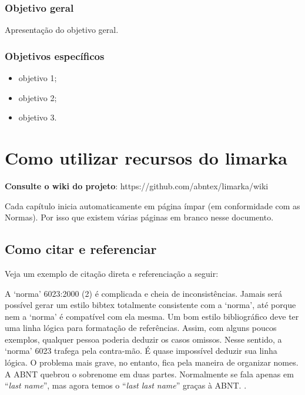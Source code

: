 \documentclass[
	12pt,				%
	oneside,			%
	a4paper,			%
	english,			%
	french,				%
	spanish,			%
	brazil				%
	]{abntex2}
\renewenvironment{quote}
  {\small\list{}{\rightmargin=0.1cm \leftmargin=4cm}%
   \item\relax}
  {\endlist}
\begin{document}
\hypertarget{objetivo-geral}{%
\subsection{Objetivo geral}\label{objetivo-geral}}

Apresentação do objetivo geral.

\hypertarget{objetivos-especuxedficos}{%
\subsection{Objetivos específicos}\label{objetivos-especuxedficos}}

\begin{itemize}
\tightlist
\item
  objetivo 1;
\item
  objetivo 2;
\item
  objetivo 3.
\end{itemize}

\hypertarget{como-utilizar-recursos-do-limarka}{%
\chapter{Como utilizar recursos do
limarka}\label{como-utilizar-recursos-do-limarka}}

\textbf{Consulte o wiki do projeto}:
https://github.com/abntex/limarka/wiki

Cada capítulo inicia automaticamente em página ímpar (em conformidade
com as Normas). Por isso que existem várias páginas em branco nesse
documento.

\hypertarget{como-citar-e-referenciar}{%
\section{Como citar e referenciar}\label{como-citar-e-referenciar}}

Veja um exemplo de citação direta e referenciação a seguir:

\begin{quote}
A `norma' 6023:2000 (2) é complicada e cheia de inconsistências. Jamais
será possível gerar um estilo bibtex totalmente consistente com a
`norma', até porque nem a `norma' é compatível com ela mesma. Um bom
estilo bibliográfico deve ter uma linha lógica para formatação de
referências. Assim, com alguns poucos exemplos, qualquer pessoa poderia
deduzir os casos omissos. Nesse sentido, a `norma' 6023 trafega pela
contra-mão. É quase impossível deduzir sua linha lógica. O problema mais
grave, no entanto, fica pela maneira de organizar nomes. A ABNT quebrou
o sobrenome em duas partes. Normalmente se fala apenas em ``\emph{last
name}'', mas agora temos o ``\emph{last last name}'' graças à ABNT.
\cite[p. 5]{abntex2cite}.
\end{quote}
\end{document}
